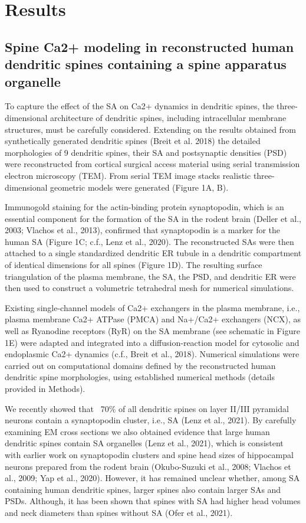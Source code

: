 \documentclass[fleqn,12pt]{wlscirep}
\begin{document}
\section*{Results}
\subsection*{Spine Ca2+ modeling in reconstructed human dendritic spines containing a spine apparatus organelle}
To capture the effect of the SA on Ca2+ dynamics in dendritic spines, the three-dimensional architecture of dendritic spines, including intracellular membrane structures, must be carefully considered. Extending on the results obtained from synthetically generated dendritic spines (Breit et al. 2018) the detailed morphologies of 9 dendritic spines, their SA and postsynaptic densities (PSD) were reconstructed from cortical surgical access material using serial transmission electron microscopy (TEM). From serial TEM image stacks realistic three-dimensional geometric models were generated (Figure 1A, B).

Immunogold staining for the actin-binding protein synaptopodin, which is an essential component for the formation of the SA in the rodent brain (Deller et al., 2003; Vlachos et al., 2013), confirmed that synaptopodin is a marker for the human SA (Figure 1C; c.f., Lenz et al., 2020). The reconstructed SAs were then attached to a single standardized dendritic ER tubule in a dendritic compartment of identical dimensions for all spines (Figure 1D). The resulting surface triangulation of the plasma membrane, the SA, the PSD, and dendritic ER were then used to construct a volumetric tetrahedral mesh for numerical simulations. 

Existing single-channel models of Ca2+ exchangers in the plasma membrane, i.e., plasma membrane Ca2+ ATPase (PMCA) and Na+/Ca2+ exchangers (NCX), as well as Ryanodine receptors (RyR) on the SA membrane (see schematic in Figure 1E) were adapted and integrated into a diffusion-reaction model for cytosolic and endoplasmic Ca2+ dynamics (c.f., Breit et al., 2018). Numerical simulations were carried out on computational domains defined by the reconstructed human dendritic spine morphologies, using established numerical methods (details provided in Methods).

We recently showed that ~70\% of all dendritic spines on layer II/III pyramidal neurons contain a synaptopodin cluster, i.e., SA (Lenz et al., 2021). By carefully examining EM cross sections we also obtained evidence that large human dendritic spines contain SA organelles (Lenz et al., 2021), which is consistent with earlier work on synaptopodin clusters and spine head sizes of hippocampal neurons prepared from the rodent brain (Okubo-Suzuki et al., 2008; Vlachos et al., 2009; Yap et al., 2020). However, it has remained unclear whether, among SA containing human dendritic spines, larger spines also contain larger SAs and PSDs. Although, it has been shown that spines with SA had higher head volumes and neck diameters than spines without SA (Ofer et al., 2021). 
\end{document}
